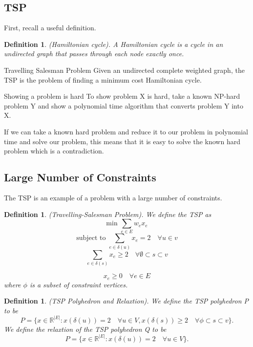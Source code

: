 \documentclass[twoside]{article}
\newtheorem{definition}[theorem]{Definition}
\begin{document}
\subsection{TSP}
First, recall a useful definition.
\begin{definition}(Hamiltonian cycle). A Hamiltonian cycle is a cycle in an undirected graph that passes through each node exactly once.
\end{definition}

\begin{definition_exam}{Travelling Salesman Problem}{} Given an undirected complete weighted graph, the TSP is the problem of finding a minimum cost Hamiltonian cycle.
\end{definition_exam}

\begin{proposition_exam}{Showing a problem is hard}{} To show problem X is hard, take a known NP-hard problem Y and show a polynomial time algorithm that converts problem Y into X.
\end{proposition_exam}
If we can take a known hard problem and reduce it to our problem in polynomial time and solve our problem, this means that it is easy to solve the known hard problem which is a contradiction.
\subsection{Large Number of Constraints}

The TSP is an example of a problem with a large number of constraints.

\begin{definition}(Travelling-Salesman Problem). We define the TSP as 
$$
\text{min }\sum_{e \in E}w_ex_e
$$
$$
\text{subject to }\sum_{e \in \delta(u)}x_e = 2 \quad \forall u \in v
$$
$$
\sum_{e \in \delta(s)}x_e \geq 2 \quad \forall \emptyset \subset s \subset v
$$

$$
x_e \geq 0 \quad \forall e \in E
$$
where $\phi$ is a subset of constraint vertices.
\end{definition}

\begin{definition}(TSP Polyhedron and Relaxtion). We define the TSP polyhedron P to be 
$$
P = \{x \in \mathbb{R}^{|E|}: x(\delta(u)) = 2 \quad \forall u \in V, x(\delta(s)) \geq 2 \quad \forall \phi \subset s \subset v\}.
$$
We define the relaxtion of the TSP polyhedron Q to be 
$$
P = \{x \in \mathbb{R}^{|E|}: x(\delta(u)) = 2 \quad \forall u \in V\}.
$$
\end{definition}
\end{document}
